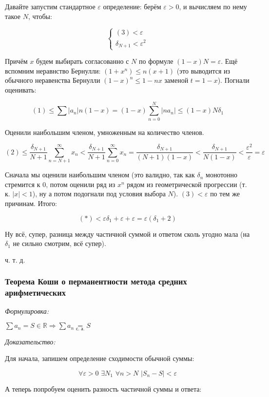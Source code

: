 \documentclass{article}
\def\dbl{\,\,}
\def\eqby#1{\underset{#1}{=}}
\begin{document}
Давайте запустим стандартное $\varepsilon$ определение: берём $\varepsilon > 0$, и вычисляем по нему такое $N$, чтобы: 

\[\begin{cases}
    (3) < \varepsilon\\
    \delta_{N + 1} < \varepsilon^2
\end{cases}\]

Причём $x$ будем выбирать согласованно с $N$ по формуле $(1 - x)N = \varepsilon$. Ещё вспомним неравнство Бернулли: $(1 + x^n) \le n(x + 1)$ (это выводится из обычного неравенства Бернулли $(1 - x)^n \le 1 - nx$ заменой $t = 1 - x$). Погнали оценивать: 

\[(1) \le \sum |a_n|n(1 - x) = (1 - x)\sum_{n = 0}^{N}|na_n| \le (1 - x)N\delta_1\]

Оценили наибольшим членом, умноженным на количество членов.

\[(2) \le \frac{\delta_{N + 1}}{N + 1}\sum_{n = N + 1}^{\infty} x_n < \frac{\delta_{N + 1}}{N + 1}\sum_{n = 0}^{\infty} x_n = \frac{\delta_{N + 1}}{(N + 1)(1 - x)} < \frac{\delta_{N + 1}}{N(1 - x)} < \frac{\varepsilon^2}{\varepsilon}= \varepsilon\]

Сначала мы оценили наибольшим членом (это валидно, так как $\delta_n$ монотонно стремится к $0$, потом оценили ряд из $x^n$ рядом из геометрической прогрессии (т. к. $|x| < 1$), ну а потом подогнали под условия выбора $N$). $(3) < \varepsilon$ по тем же причинам. Итого: 

\[(*) < \varepsilon\delta_1 + \varepsilon + \varepsilon = \varepsilon(\delta_1 + 2)\]

Ну всё, супер, разница между частичной суммой и ответом сколь угодно мала (на $\delta_1$ не сильно смотрим, всё супер).

ч. т. д.

\subsubsection{Теорема Коши о перманентности метода средних арифметических}
\textit{Формулировка:}

$\sum a_n = S \in \mathbb{R} \Rightarrow \sum a_n \eqby{\text{с. а.}} S$

\textit{Доказательство:}

Для начала, запишем определение сходимости обычной суммы:

\[\forall \varepsilon > 0 \dbl \exists N_{1} \dbl \forall n > N \dbl |S_n - S| < \varepsilon\]

А теперь попробуем оценить разность частичной суммы и ответа:
\end{document}
